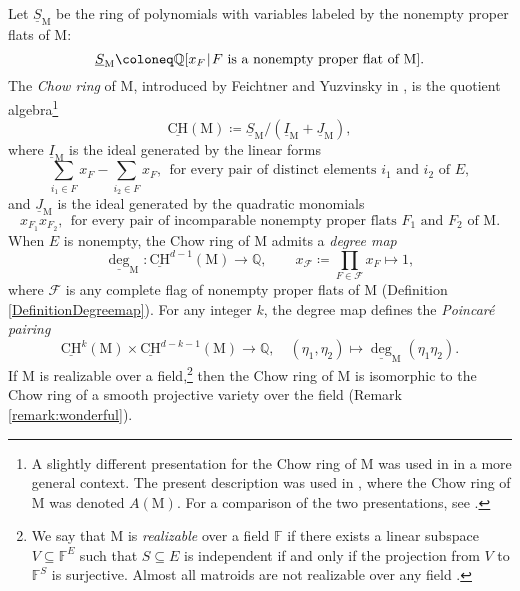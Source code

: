 \documentclass[11pt,reqno]{amsart}
\theoremstyle{definition}
\theoremstyle{remark}
\renewcommand{\(}{\left(}
\renewcommand{\)}{\right)}
\newcommand{\<}{\left<}
\renewcommand{\>}{\right>}
\renewcommand{\mid}{\hspace{0.3mm}|\hspace{0.3mm}}
\begin{document}
\subsection{} 
Let $\underline{S}_\mathrm{M}$  be the ring of polynomials with variables labeled by the nonempty proper flats of $\mathrm{M}$:
\[
\underline{S}_\mathrm{M} \coloneq \mathbb{Q}[x_F\mid \text{$F$ is a nonempty proper flat of $\mathrm{M}$}].
\]
The \emph{Chow ring} of $\mathrm{M}$, introduced by Feichtner and Yuzvinsky in \cite{FY}, is the quotient algebra\footnote{A slightly different presentation for the Chow ring of $\mathrm{M}$ was used in \cite{FY} in a more general context. The present description was used in \cite{AHK}, where the Chow ring of $\mathrm{M}$ was denoted $A(\mathrm{M})$.
 For a comparison of the two presentations, see \cite{BES}.}
\[
\underline{\mathrm{CH}}(\mathrm{M}) \coloneq \underline{S}_\mathrm{M}/(\underline{I}_\mathrm{M}+\underline{J}_\mathrm{M}),
\]
where $\underline{I}_\mathrm{M}$ is the ideal generated by the linear forms
\[
\sum_{i_1 \in F} x_F -\sum_{i_2 \in F} x_F, \ \ \text{for every pair of distinct elements $i_1$ and $i_2$ of $E$},
\]
and $\underline{J}_\mathrm{M}$  is the ideal generated by the quadratic monomials
\[
x_{F_1}x_{F_2}, \ \ \text{for every pair of incomparable nonempty proper flats $F_1$ and $F_2$ of $\mathrm{M}$.}
\]
When $E$ is nonempty, the Chow ring of $\mathrm{M}$ admits a \emph{degree map}  %
\[
\underline{\deg}_\mathrm{M}:\underline{\mathrm{CH}}^{d-1}(\mathrm{M}) \longrightarrow \mathbb{Q}, \qquad x_\mathscr{F}\coloneq \prod_{F \in \mathscr{F}} x_{F}\longmapsto 1,
\]
where $\mathscr{F}$ is any complete flag of nonempty proper flats of $\mathrm{M}$ (Definition \ref{DefinitionDegreemap}).
For any integer $k$, the degree map defines the \emph{Poincar\'e pairing}
\[
\underline{\mathrm{CH}}^k(\mathrm{M})  \times \underline{\mathrm{CH}}^{d-k-1}(\mathrm{M})  \longrightarrow \mathbb{Q}, \quad (\eta_1,\eta_2) \longmapsto \underline{\deg}_\mathrm{M}(\eta_1 \eta_2).
\]
If $\mathrm{M}$ is realizable over a field,\footnote{
We say that $\mathrm{M}$ is \emph{realizable} over a field $\mathbb{F}$ if there 
exists a linear subspace $V\subseteq \mathbb{F}^E$ such that $S\subseteq E$ is independent
if and only if the projection from $V$ to $\mathbb{F}^S$ is surjective.
Almost all matroids are not realizable over any field \cite{Nelson}.}
then the Chow ring of $\mathrm{M}$ is isomorphic to the Chow ring of a smooth projective variety over the field (Remark \ref{remark:wonderful}).
\end{document}
